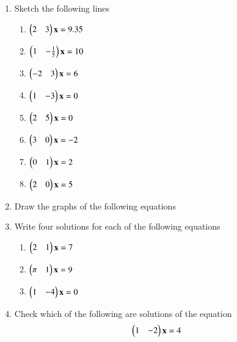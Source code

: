 \begin{enumerate}[label=\arabic*.,ref=\thesubsection.\theenumi]
\item Sketch the following lines
%
\begin{enumerate}[itemsep=2pt]
\item
$
\begin{pmatrix}2 & 3 \end{pmatrix}\mathbf{x}=9.35
$
\item
$
\begin{pmatrix}1 & -\frac{1}{5} \end{pmatrix}\mathbf{x}=10
$
\item
$
\begin{pmatrix}-2 & 3 \end{pmatrix}\mathbf{x}=6
$
\item
$
\begin{pmatrix}1 & -3 \end{pmatrix}\mathbf{x}=0
$
\item
$
\begin{pmatrix}2 & 5 \end{pmatrix}\mathbf{x}=0
$
\item
$
\begin{pmatrix}3 & 0 \end{pmatrix}\mathbf{x}=-2
$
\item
$
\begin{pmatrix}0 & 1 \end{pmatrix}\mathbf{x}=2
$
\item
$
\begin{pmatrix}2 & 0 \end{pmatrix}\mathbf{x}=5
$
\end{enumerate}
%
\solution 

%
\item Draw the graphs of the following equations
\begin{enumerate}[itemsep=2pt]
\end{enumerate}
%
\item Write four solutions for each of the following equations
\begin{enumerate}
\item $\begin{pmatrix}2 & 1\end{pmatrix}\mathbf{x} = 7$
\item $\begin{pmatrix} \pi & 1\end{pmatrix}\mathbf{x}  = 9 $
\item $\begin{pmatrix} 1 & -4\end{pmatrix}\mathbf{x}  = 0$
\end{enumerate}
\solution 

%
\item Check which of the following are solutions of the equation 
%
\begin{align}
\begin{pmatrix}1 & -2\end{pmatrix}\mathbf{x} &= 4
\end{align}
%
%
\begin{enumerate}[itemsep=2pt]

\end{enumerate}
\end{enumerate}
